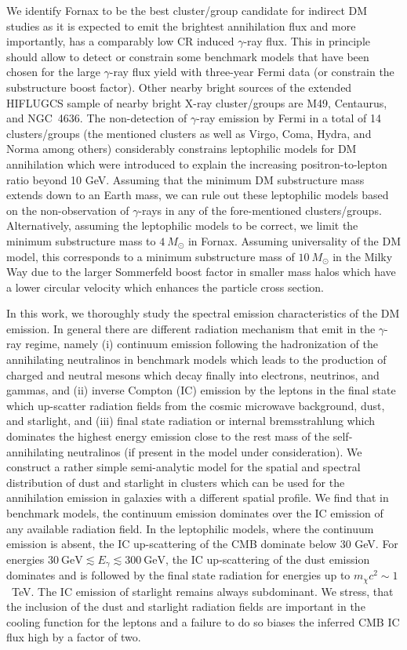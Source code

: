\documentclass[10pt,aps,pra,reprint,amsmath,amsfonts,amssymb,showpacs]{revtex4-1}
\newcommand{\msun}{M_\odot}
\begin{document}
We identify Fornax to be the best cluster/group candidate for indirect DM
studies as it is expected to emit the brightest annihilation flux and more
importantly, has a comparably low CR induced $\gamma$-ray flux.  This in
principle should allow to detect or constrain some benchmark models that have
been chosen for the large $\gamma$-ray flux yield with three-year Fermi data
(or constrain the substructure boost factor). Other nearby bright sources of the
extended HIFLUGCS sample of nearby bright X-ray cluster/groups are M49,
Centaurus, and NGC~4636.  The non-detection of $\gamma$-ray emission by Fermi in
a total of 14 clusters/groups (the mentioned clusters as well as Virgo, Coma,
Hydra, and Norma among others) considerably constrains leptophilic models for DM
annihilation which were introduced to explain the increasing positron-to-lepton
ratio beyond 10 GeV. Assuming that the minimum DM substructure mass extends down
to an Earth mass, we can rule out these leptophilic models based on the
non-observation of $\gamma$-rays in any of the fore-mentioned
clusters/groups. Alternatively, assuming the leptophilic models to be correct,
we limit the minimum substructure mass to $4~\msun$ in Fornax. Assuming
universality of the DM model, this corresponds to a minimum substructure mass of
$10~\msun$ in the Milky Way due to the larger Sommerfeld boost factor in smaller
mass halos which have a lower circular velocity which enhances the particle
cross section.

In this work, we thoroughly study the spectral emission characteristics of the
DM emission. In general there are different radiation mechanism that emit in the
$\gamma$-ray regime, namely (i) continuum emission following the hadronization
of the annihilating neutralinos in benchmark models which leads to the
production of charged and neutral mesons which decay finally into electrons,
neutrinos, and gammas, and (ii) inverse Compton (IC) emission by the leptons in
the final state which up-scatter radiation fields from the cosmic microwave
background, dust, and starlight, and (iii) final state radiation or internal
bremsstrahlung which dominates the highest energy emission close to the rest
mass of the self-annihilating neutralinos (if present in the model under
consideration). We construct a rather simple semi-analytic model for the spatial
and spectral distribution of dust and starlight in clusters which can be used
for the annihilation emission in galaxies with a different spatial profile.  We
find that in benchmark models, the continuum emission dominates over the IC
emission of any available radiation field. In the leptophilic models, where the
continuum emission is absent, the IC up-scattering of the CMB dominate below 30
GeV. For energies $30~\mathrm{GeV} \lesssim E_\gamma \lesssim 300~\mathrm{GeV}$,
the IC up-scattering of the dust emission dominates and is followed by the final
state radiation for energies up to $m_\chi c^2 \sim 1$~TeV. The IC emission of
starlight remains always subdominant. We stress, that the inclusion of the dust
and starlight radiation fields are important in the cooling function for the
leptons and a failure to do so biases the inferred CMB IC flux high by a factor
of two.
\end{document}
